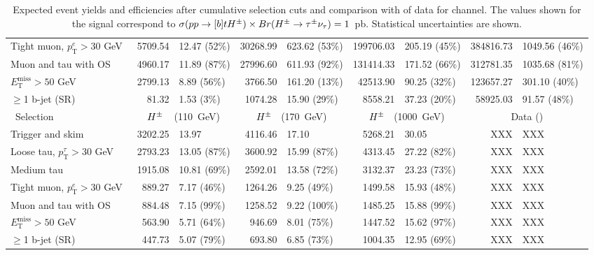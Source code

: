 \begin{table}[!thp]
\begin{center}
{\begin{tabular}{|l|r@{ $\pm$ }l|r@{ $\pm$ }l|r@{ $\pm$ }l|r@{ $\pm$ }l|}
			Tight muon, $p_\mathrm{T}^{e}>30$ GeV           & 5709.54 & 12.47 (52\%) & 30268.99 & 623.62 (53\%) & 199706.03 & 205.19 (45\%) & 384816.73 & 1049.56 (46\%) \\
			Muon and tau with OS                         & 4960.17 & 11.89 (87\%) & 27996.60 & 611.93 (92\%) & 131414.33 & 171.52 (66\%) & 312781.35 & 1035.68 (81\%) \\
			$E_\mathrm{T}^\mathrm{miss}>50$ GeV\       & 2799.13 & 8.89 (56\%) & 3766.50 & 161.20 (13\%) & 42513.90 & 90.25 (32\%) & 123657.27 & 301.10 (40\%) \\
			$\ge$1 b-jet (SR)                          & 81.32 & 1.53 (3\%) & 1074.28 & 15.90 (29\%) & 8558.21 & 37.23 (20\%) & 58925.03 & 91.57 (48\%) \\
			\hline\
			Selection                                        & \multicolumn{2}{c|}{$H^{\pm}$ $\phantom{c|}$(110~GeV)} & \multicolumn{2}{c|}{$H^{\pm}$ $\phantom{0}$(170~GeV)} & \multicolumn{2}{c|}{$H^{\pm}$ $\phantom{0}$(1000~GeV)} & \multicolumn{2}{c|}{Data (\LUMI )}  \\ 
			\hline
			Trigger and skim                            & 3202.25 & 13.97 & 4116.46 & 17.10 & 5268.21 & 30.05 & XXX & XXX \\
			Loose tau, $p_\mathrm{T}^{\tau}>30$ GeV & 2793.23 & 13.05 (87\%) & 3600.92 & 15.99 (87\%) & 4313.45 & 27.22 (82\%) & XXX & XXX \\
			Medium tau   & 1915.08 & 10.81 (69\%) & 2592.01 & 13.58 (72\%) & 3132.37 & 23.23 (73\%) & XXX & XXX \\
			Tight muon, $p_\mathrm{T}^{e}>30$ GeV\  & 889.27 & 7.17 (46\%) & 1264.26 & 9.25 (49\%) & 1499.58 & 15.93 (48\%) & XXX & XXX \\
			Muon and tau with OS                    & 884.48 & 7.15 (99\%) & 1258.52 & 9.22 (100\%) & 1485.25 & 15.88 (99\%) & XXX & XXX \\
			$E_\mathrm{T}^\mathrm{miss}>50$ GeV\          & 563.90 & 5.71 (64\%) & 946.69 & 8.01 (75\%) & 1447.52 & 15.62 (97\%) & XXX & XXX \\
			$\ge$1 b-jet (SR)                            & 447.73 & 5.07 (79\%) & 693.80 & 6.85 (73\%) & 1004.35 & 12.95 (69\%) & XXX & XXX \\
			\hline
			\end{tabular}}
			 \caption{\label{tab:expected_yields_taumu}
			     Expected event yields and efficiencies after cumulative selection cuts and comparison with \LUMI of
			     data for \taumu channel. 
			     The values shown for the signal correspond to $\sigma(pp \to [b]tH^{\pm}) \times Br(H^{\pm} \to \tau^{\pm} \nu_{\tau})=1$~pb.
			     Statistical uncertainties are shown.}
			 \end{center}
	   \end{table}


